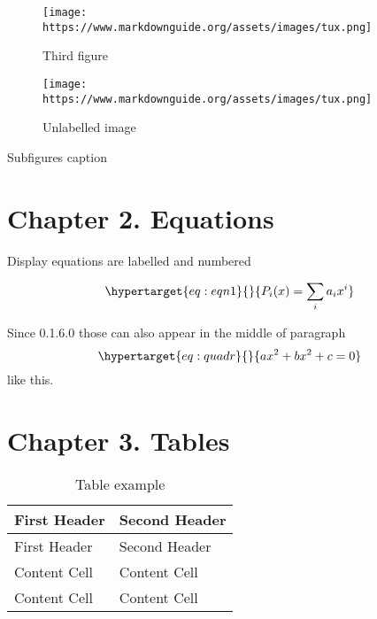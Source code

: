 \begin{figure}
\hypertarget{fig:figure3}{%
\centering
\texttt{[image: https://www.markdownguide.org/assets/images/tux.png]}
\caption{Third figure}\label{fig:figure3}
}
\end{figure}

\begin{figure}
\centering
\texttt{[image: https://www.markdownguide.org/assets/images/tux.png]}
\caption{Unlabelled image}
\end{figure}

\begin{pandoccrossrefsubfigures}



\caption[{Subfigures caption}]{Subfigures caption}

\label{fig:subfigures}

\end{pandoccrossrefsubfigures}

\hypertarget{sec:sec2}{%
\section{Chapter 2. Equations}\label{sec:sec2}}

Display equations are labelled and numbered

\begin{equation}\protect\hypertarget{eq:eqn1}{}{ P_i(x) = \sum_i a_i x^i }\label{eq:eqn1}\end{equation}

Since 0.1.6.0 those can also appear in the middle of paragraph
\begin{equation}\protect\hypertarget{eq:quadr}{}{a x^2 + b x^2 + c = 0}\label{eq:quadr}\end{equation}
like this.

\hypertarget{sec:chapter-3.-tables}{%
\section{Chapter 3. Tables}\label{sec:chapter-3.-tables}}

\hypertarget{tbl:table1}{}
\begin{longtable}[]{@{}ll@{}}
\caption{\label{tbl:table1}Table example}\tabularnewline
\toprule()
First Header & Second Header \\
\midrule()
\endfirsthead
\toprule()
First Header & Second Header \\
\midrule()
\endhead
Content Cell & Content Cell \\
Content Cell & Content Cell \\
\bottomrule()
\end{longtable}

